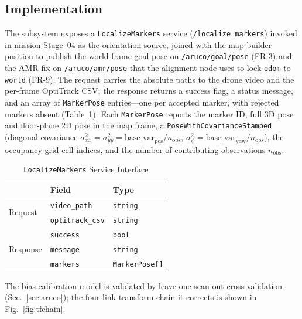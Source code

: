 \documentclass[conference]{IEEEtran}
\begin{document}
\subsection{Implementation}
The subsystem exposes a \texttt{LocalizeMarkers} service (\texttt{/localize\_markers})
invoked in mission Stage~04 as the orientation source, joined with the map-builder
position to publish the world-frame goal pose on \texttt{/aruco/goal/pose} (FR-3)
and the AMR fix on \texttt{/aruco/amr/pose} that the alignment node uses to lock
\texttt{odom} to \texttt{world} (FR-9). The request carries the absolute paths to the drone
video and the per-frame OptiTrack CSV; the response returns a success flag, a
status message, and an array of \texttt{MarkerPose} entries---one per accepted
marker, with rejected markers absent (Table~\ref{tab:marker-srv}). Each
\texttt{MarkerPose} reports the marker ID, full 3D pose and floor-plane 2D pose
in the map frame, a \texttt{PoseWithCovarianceStamped} (diagonal covariance
$\sigma^2_{xx}=\sigma^2_{yy}=\text{base\_var}_\text{pos}/n_\text{obs}$,
$\sigma^2_{\psi}=\text{base\_var}_\text{yaw}/n_\text{obs}$), the occupancy-grid
cell indices, and the number of contributing observations $n_\text{obs}$.

\begin{table}[t]
\caption{\texttt{LocalizeMarkers} Service Interface}
\label{tab:marker-srv}
\centering
\begin{tabular}{@{}lll@{}}
\toprule
 & \textbf{Field} & \textbf{Type} \\
\midrule
\multirow{2}{*}{Request}
 & \texttt{video\_path}    & \texttt{string} \\
 & \texttt{optitrack\_csv} & \texttt{string} \\
\midrule
\multirow{3}{*}{Response}
 & \texttt{success} & \texttt{bool} \\
 & \texttt{message} & \texttt{string} \\
 & \texttt{markers} & \texttt{MarkerPose[]} \\
\bottomrule
\end{tabular}
\end{table}

The bias-calibration model is validated by leave-one-scan-out cross-validation
(Sec.~\ref{sec:aruco}); the four-link transform chain it corrects is shown in
Fig.~\ref{fig:tfchain}.
\end{document}
